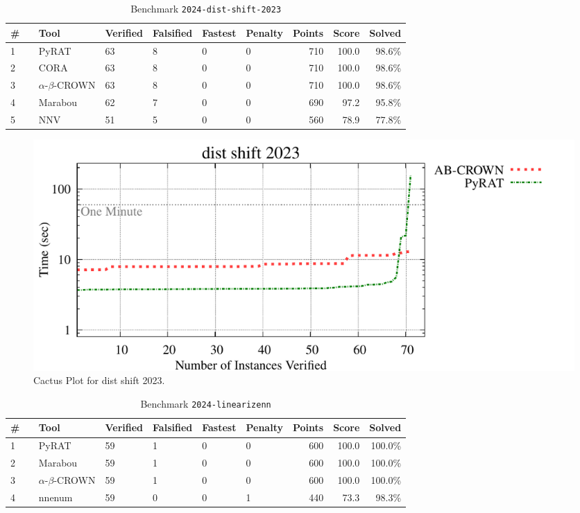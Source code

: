 \begin{table}[h]
\begin{center}
\caption{Benchmark \texttt{2024-dist-shift-2023}} \label{tab:cat_{cat}}
{\setlength{\tabcolsep}{2pt}
\begin{tabular}[h]{@{}llllllrrr@{}}
\toprule
\textbf{\# ~} & \textbf{Tool} & \textbf{Verified} & \textbf{Falsified} & \textbf{Fastest} & \textbf{Penalty} & \textbf{Points} & \textbf{Score} & \textbf{Solved}\\
\midrule
1 & PyRAT & 63 & 8 & 0 & 0 & 710 & 100.0 & 98.6\% \\
2 & CORA & 63 & 8 & 0 & 0 & 710 & 100.0 & 98.6\% \\
3 & $\alpha$-$\beta$-CROWN & 63 & 8 & 0 & 0 & 710 & 100.0 & 98.6\% \\
4 & Marabou & 62 & 7 & 0 & 0 & 690 & 97.2 & 95.8\% \\
5 & NNV & 51 & 5 & 0 & 0 & 560 & 78.9 & 77.8\% \\
\bottomrule
\end{tabular}
}
\end{center}
\end{table}



\begin{figure}[h]
\centerline{\includegraphics[width=\textwidth]{cactus/2024_dist_shift_2023.pdf}}
\caption{Cactus Plot for dist shift 2023.}
\label{fig:quantPic}
\end{figure}


\clearpage

\begin{table}[h]
\begin{center}
\caption{Benchmark \texttt{2024-linearizenn}} \label{tab:cat_{cat}}
{\setlength{\tabcolsep}{2pt}
\begin{tabular}[h]{@{}llllllrrr@{}}
\toprule
\textbf{\# ~} & \textbf{Tool} & \textbf{Verified} & \textbf{Falsified} & \textbf{Fastest} & \textbf{Penalty} & \textbf{Points} & \textbf{Score} & \textbf{Solved}\\
\midrule
1 & PyRAT & 59 & 1 & 0 & 0 & 600 & 100.0 & 100.0\% \\
2 & Marabou & 59 & 1 & 0 & 0 & 600 & 100.0 & 100.0\% \\
3 & $\alpha$-$\beta$-CROWN & 59 & 1 & 0 & 0 & 600 & 100.0 & 100.0\% \\
4 & nnenum & 59 & 0 & 0 & 1 & 440 & 73.3 & 98.3\% \\
\bottomrule
\end{tabular}
}
\end{center}
\end{table}



